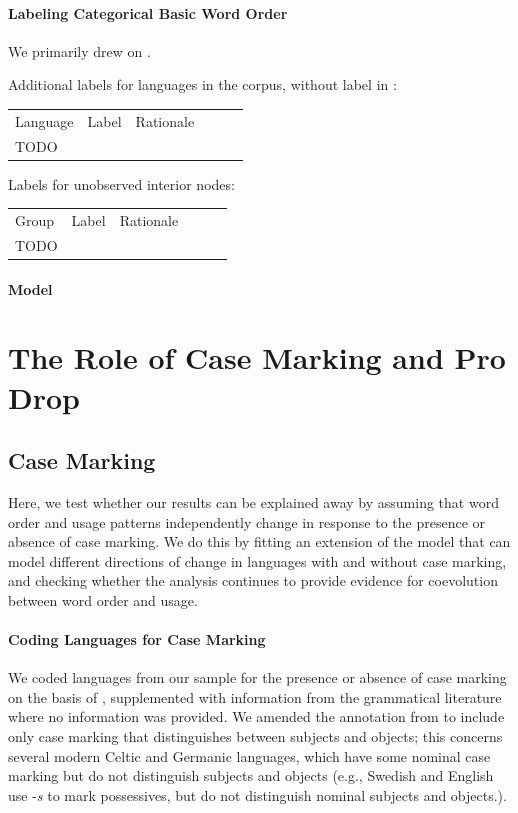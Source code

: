 \documentclass[11pt,a4paper]{article}
\begin{document}
\paragraph{Labeling Categorical Basic Word Order}

We primarily drew on \citep{gell-mann-origin-2011}.

Additional labels for languages in the corpus, without label in \citep{wals-81}:

\begin{longtable}{llllll}
Language & Label & Rationale \\
TODO
\end{longtable}

Labels for unobserved interior nodes:

\begin{longtable}{llllll}
Group & Label & Rationale \\
TODO
\end{longtable}

\paragraph{Model}


\section{The Role of Case Marking and Pro Drop}

\subsection{Case Marking}
Here, we test whether our results can be explained away by assuming that word order and usage patterns independently change in response to the presence or absence of case marking.
We do this by fitting an extension of the model that can model different directions of change in languages with and without case marking, and checking whether the analysis continues to provide evidence for coevolution between word order and usage.

\paragraph{Coding Languages for Case Marking}
We coded languages from our sample for the presence or absence of case marking on the basis of \citep{wals-49}, supplemented with information from the grammatical literature where no information was provided.
We amended the annotation from \citep{wals-49} to include only case marking that distinguishes between subjects and objects; this concerns several modern Celtic and Germanic languages, which have some nominal case marking but do not distinguish subjects and objects (e.g., Swedish and English use -\textit{s} to mark possessives, but do not distinguish nominal subjects and objects.).
\end{document}
